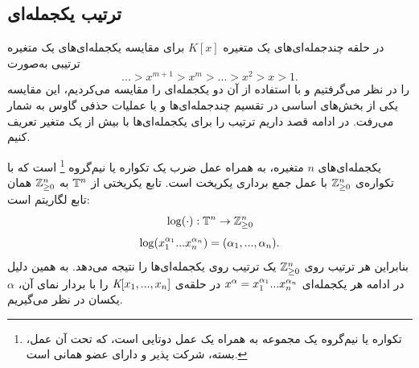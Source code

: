 
\subsection*{ترتیب یکجمله‌ای}
در حلقه‌  چندجمله‌ای‌های یک متغیره 
$\textit{K}[x]$
برای مقایسه‌  یکجمله‌ای‌های یک متغیره ترتیبی به‌صورت 
$$...> x^{m+1} > x^{m} > ... > x^{2} > x > 1.$$
را در نظر می‌گرفتیم و با استفاده از آن دو یکجمله‌ای را مقایسه می‌کردیم، این مقایسه یکی از بخش‌های اساسی در  تقسیم چندجمله‌ای‌ها  و یا عملیات حذفی گاوس به شمار می‌رفت. در ادامه قصد داریم ترتیب را برای یکجمله‌ای‌ها با بیش از یک متغیر تعریف کنیم. 

یکجمله‌ای‌های 
$n$
متغیره،
به همراه عمل ضرب یک تکواره
یا نیم‌گروه
\footnote{تکواره یا نیم‌گروه یک  مجموعه به همراه یک عمل دوتایی است، که تحت آن عمل، بسته، شرکت پذیر و دارای عضو همانی است.}
است که با تکواره‌ی 
$\mathbb{Z}_{\geq 0}^{n}$
با عمل جمع برداری یکریخت است. تابع یکریختی از 
${\mathbb{T}}^{n}$
به 
$\mathbb{Z}_{\geq 0}^{n}$
همان تابع لگاریتم است: 
$$\log(\cdot): {\mathbb{T}}^{n}\rightarrow \mathbb{Z}_{\geq 0}^{n}$$
$$\log(x_{1}^{\alpha_{1}}...x_{n}^{\alpha_{n}}) = (\alpha_{1},...,\alpha_{n}).$$
بنابراین هر ترتیب روی 
$\mathbb{Z}_{\geq 0}^{n}$
 یک ترتیب روی یکجمله‌ای‌ها را نتیجه می‌دهد. به همین دلیل در ادامه هر یکجمله‌ای 
 $x^{\alpha} = x_{1}^{\alpha_{1}}...x_{n}^{\alpha_{n}}$
 در حلقه‌ی 
 $\textit{K}[x_{1},...,x_{n}]$
 را با بردار نمای آن، 
 $\alpha$
  یکسان در نظر می‌گیریم.
  

